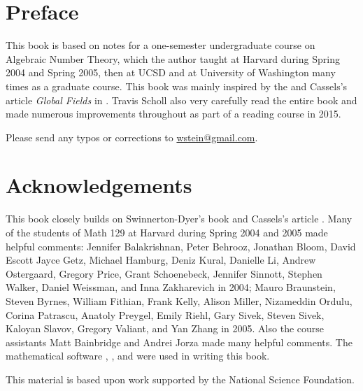 
\chapter{Preface}

This book is based on notes for a one-semester
undergraduate course on Algebraic Number Theory, which the author
taught at Harvard during Spring 2004 and Spring 2005, then at UCSD
and at University of Washington many times as a graduate course.
This book was mainly inspired by the \cite[Ch.~1]{sd:brief} and
Cassels's article {\em Global Fields} in \cite{cassels:global}.
Travis Scholl also very carefully read the entire book and made
numerous improvements throughout as part of a
reading course in 2015.

Please send any typos or corrections to \url{wstein@gmail.com}.

\chapter{Acknowledgements}

This book closely builds on
Swinnerton-Dyer's book \cite{sd:brief} and Cassels's article
\cite{cassels:global}. Many of the students of Math 129 at Harvard
during Spring 2004 and 2005 made helpful comments: Jennifer
Balakrishnan, Peter Behrooz, Jonathan Bloom, David Escott Jayce Getz,
Michael Hamburg, Deniz Kural, Danielle Li, Andrew Ostergaard, Gregory
Price, Grant Schoenebeck, Jennifer Sinnott, Stephen Walker, Daniel
Weissman, and Inna Zakharevich in 2004; Mauro Braunstein, Steven
Byrnes, William Fithian, Frank Kelly, Alison Miller, Nizameddin
Ordulu, Corina Patrascu, Anatoly Preygel, Emily Riehl, Gary Sivek,
Steven Sivek, Kaloyan Slavov, Gregory Valiant, and Yan Zhang in 2005.
Also the course assistants Matt Bainbridge and Andrei Jorza made many
helpful comments.  The mathematical software \cite{sage}, \cite{pari},
and \cite{magma} were used in writing this book.

This material is based upon work supported by the National Science
Foundation.
